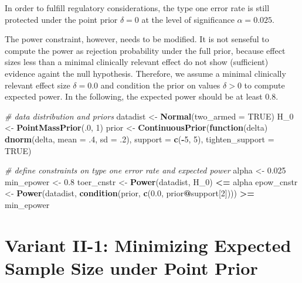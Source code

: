 \documentclass[]{book}
\newenvironment{Shaded}{\begin{snugshade}}{\end{snugshade}}
\newcommand{\CommentTok}[1]{\textcolor[rgb]{0.56,0.35,0.01}{\textit{#1}}}
\newcommand{\ControlFlowTok}[1]{\textcolor[rgb]{0.13,0.29,0.53}{\textbf{#1}}}
\newcommand{\DataTypeTok}[1]{\textcolor[rgb]{0.13,0.29,0.53}{#1}}
\newcommand{\DecValTok}[1]{\textcolor[rgb]{0.00,0.00,0.81}{#1}}
\newcommand{\FloatTok}[1]{\textcolor[rgb]{0.00,0.00,0.81}{#1}}
\newcommand{\KeywordTok}[1]{\textcolor[rgb]{0.13,0.29,0.53}{\textbf{#1}}}
\newcommand{\NormalTok}[1]{#1}
\newcommand{\OperatorTok}[1]{\textcolor[rgb]{0.81,0.36,0.00}{\textbf{#1}}}
\newcommand{\OtherTok}[1]{\textcolor[rgb]{0.56,0.35,0.01}{#1}}
\newcommand{\StringTok}[1]{\textcolor[rgb]{0.31,0.60,0.02}{#1}}
\begin{document}
In order to fulfill regulatory considerations, the type one error rate
is still protected under the point prior \(\delta = 0\) at the level
of significance \(\alpha = 0.025\).

The power constraint, however, needs to be modified.
It is not senseful to compute the power as rejection probability under
the full prior, because effect sizes less than a minimal clinically relevant
effect do not show (sufficient) evidence againt the null hypothesis.
Therefore, we assume a minimal clinically relevant effect size
\(\delta = 0.0\) and condition the prior on values \(\delta > 0\)
to compute expected power.
In the following, the expected power should be at least \(0.8\).

\begin{Shaded}
\begin{Highlighting}[]
\CommentTok{# data distribution and priors}
\NormalTok{datadist   <-}\StringTok{ }\KeywordTok{Normal}\NormalTok{(}\DataTypeTok{two_armed =} \OtherTok{TRUE}\NormalTok{)}
\NormalTok{H_}\DecValTok{0}\NormalTok{        <-}\StringTok{ }\KeywordTok{PointMassPrior}\NormalTok{(.}\DecValTok{0}\NormalTok{, }\DecValTok{1}\NormalTok{)}
\NormalTok{prior      <-}\StringTok{ }\KeywordTok{ContinuousPrior}\NormalTok{(}\ControlFlowTok{function}\NormalTok{(delta) }\KeywordTok{dnorm}\NormalTok{(delta, }\DataTypeTok{mean =} \FloatTok{.4}\NormalTok{, }\DataTypeTok{sd =} \FloatTok{.2}\NormalTok{),}
                              \DataTypeTok{support =} \KeywordTok{c}\NormalTok{(}\OperatorTok{-}\DecValTok{5}\NormalTok{, }\DecValTok{5}\NormalTok{),}
                              \DataTypeTok{tighten_support =} \OtherTok{TRUE}\NormalTok{)}

\CommentTok{# define constraints on type one error rate and expected power}
\NormalTok{alpha      <-}\StringTok{ }\FloatTok{0.025}
\NormalTok{min_epower <-}\StringTok{ }\FloatTok{0.8}
\NormalTok{toer_cnstr <-}\StringTok{ }\KeywordTok{Power}\NormalTok{(datadist, H_}\DecValTok{0}\NormalTok{) }\OperatorTok{<=}\StringTok{ }\NormalTok{alpha}
\NormalTok{epow_cnstr <-}\StringTok{ }\KeywordTok{Power}\NormalTok{(datadist, }\KeywordTok{condition}\NormalTok{(prior, }\KeywordTok{c}\NormalTok{(}\FloatTok{0.0}\NormalTok{, prior}\OperatorTok{@}\NormalTok{support[}\DecValTok{2}\NormalTok{]))) }\OperatorTok{>=}\StringTok{ }\NormalTok{min_epower}
\end{Highlighting}
\end{Shaded}

\hypertarget{variantII_1}{%
\section{Variant II-1: Minimizing Expected Sample Size under Point Prior}\label{variantII_1}}
\end{document}
